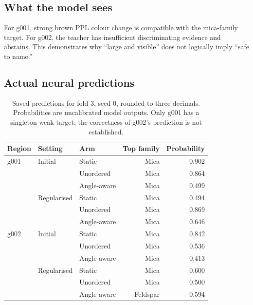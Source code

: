 \subsection{What the model sees}
For g001, strong brown PPL colour change is compatible with the mica-family target. For g002, the teacher has insufficient discriminating evidence and abstains. This demonstrates why ``large and visible'' does not logically imply ``safe to name.''
\FloatBarrier

\subsection{Actual neural predictions}
\begin{table}[H]\centering\small
\begin{tabular}{@{}lllrr@{}}\toprule Region & Setting & Arm & Top family & Probability\\\midrule
g001 & Initial & Static & Mica & 0.902\\
 & & Unordered & Mica & 0.864\\
 & & Angle-aware & Mica & 0.499\\
 & Regularised & Static & Mica & 0.494\\
 & & Unordered & Mica & 0.869\\
 & & Angle-aware & Mica & 0.646\\\midrule
g002 & Initial & Static & Mica & 0.842\\
 & & Unordered & Mica & 0.536\\
 & & Angle-aware & Mica & 0.413\\
 & Regularised & Static & Mica & 0.600\\
 & & Unordered & Mica & 0.500\\
 & & Angle-aware & Feldspar & 0.594\\\bottomrule
\end{tabular}
\caption{Saved predictions for fold 3, seed 0, rounded to three decimals. Probabilities are uncalibrated model outputs. Only g001 has a singleton weak target; the correctness of g002's prediction is not established.}
\end{table}

